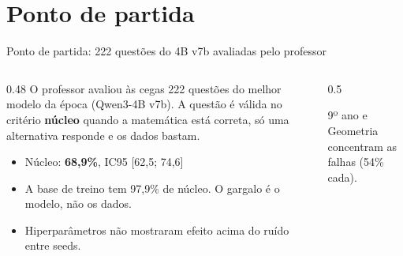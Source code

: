 \documentclass[aspectratio=169,11pt]{beamer}
\begin{document}
\section{Ponto de partida}
\begin{frame}{Ponto de partida: 222 questões do 4B v7b avaliadas pelo professor}
  \begin{columns}[T]
    \begin{column}{0.48\textwidth}
      \small
      O professor avaliou às cegas 222 questões do melhor modelo da época (Qwen3-4B v7b).
      A questão é válida no critério \textbf{núcleo} quando a matemática está correta, só uma
      alternativa responde e os dados bastam.
      \vspace{4pt}
      \begin{itemize}
        \item Núcleo: \textbf{68,9\%}, IC95 [62,5; 74,6]
        \item A base de treino tem 97,9\% de núcleo. O gargalo é o modelo, não os dados.
        \item Hiperparâmetros não mostraram efeito acima do ruído entre seeds.
      \end{itemize}
    \end{column}
    \begin{column}{0.5\textwidth}
      \centering

      {\scriptsize 9º ano e Geometria concentram as falhas (54\% cada).}
    \end{column}
  \end{columns}
\end{frame}
\end{document}
